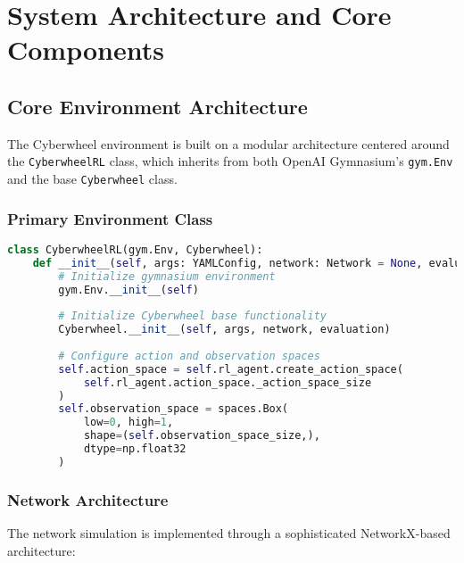 \documentclass[12pt,a4paper]{article}
\begin{document}
\section{System Architecture and Core Components}

\subsection{Core Environment Architecture}

The Cyberwheel environment is built on a modular architecture centered around the \texttt{CyberwheelRL} class, which inherits from both OpenAI Gymnasium's \texttt{gym.Env} and the base \texttt{Cyberwheel} class.

\subsubsection{Primary Environment Class}
\begin{lstlisting}[language=Python, caption=Core CyberwheelRL Implementation]
class CyberwheelRL(gym.Env, Cyberwheel):
    def __init__(self, args: YAMLConfig, network: Network = None, evaluation: bool = False):
        # Initialize gymnasium environment
        gym.Env.__init__(self)
        
        # Initialize Cyberwheel base functionality
        Cyberwheel.__init__(self, args, network, evaluation)
        
        # Configure action and observation spaces
        self.action_space = self.rl_agent.create_action_space(
            self.rl_agent.action_space._action_space_size
        )
        self.observation_space = spaces.Box(
            low=0, high=1, 
            shape=(self.observation_space_size,), 
            dtype=np.float32
        )
\end{lstlisting}

\subsubsection{Network Architecture}

The network simulation is implemented through a sophisticated NetworkX-based architecture:
\end{document}
